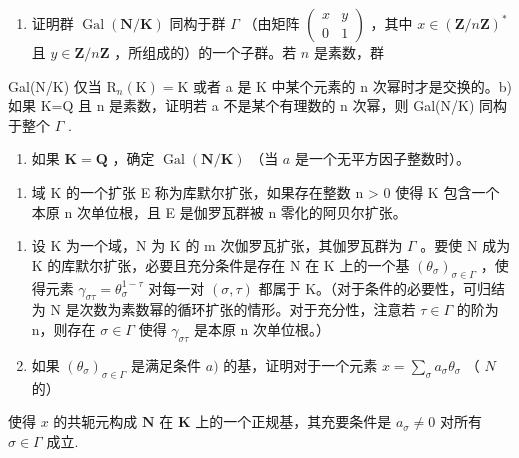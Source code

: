 \begin{enumerate}
\def\labelenumi{\alph{enumi})}
\tightlist
\item
  证明群 \(\operatorname{Gal}(\mathbf{N} / \mathbf{K})\) 同构于群 \(\Gamma\) （由矩阵 \(\left( \begin{array}{cc}x & y\\ 0 & 1 \end{array} \right)\) ，其中 \(x\in (\mathbf{Z} / n\mathbf{Z})^*\) 且 \(y\in \mathbf{Z} / n\mathbf{Z}\) ，所组成的）的一个子群。若 \(n\) 是素数，群
\end{enumerate}

Gal(N/K) 仅当 \(\mathrm{R}_{n}(\mathrm{K})=\mathrm{K}\) 或者 a 是 K 中某个元素的 n 次幂时才是交换的。b) 如果 K=Q 且 n 是素数，证明若 a 不是某个有理数的 n 次幂，则 Gal(N/K) 同构于整个 \(\Gamma\) .

\begin{enumerate}
\def\labelenumi{\alph{enumi})}
\setcounter{enumi}{2}
\tightlist
\item
  如果 \(\mathbf{K} = \mathbf{Q}\) ，确定 \(\operatorname{Gal}(\mathbf{N} / \mathbf{K})\) （当 \(a\) 是一个无平方因子整数时）。
\end{enumerate}

\begin{enumerate}
\def\labelenumi{\arabic{enumi})}
\setcounter{enumi}{6}
\tightlist
\item
  域 K 的一个扩张 E 称为库默尔扩张，如果存在整数 n \textgreater{} 0 使得 K 包含一个本原 n 次单位根，且 E 是伽罗瓦群被 n 零化的阿贝尔扩张。
\end{enumerate}

\begin{enumerate}
\def\labelenumi{\alph{enumi})}
\item
  设 K 为一个域，N 为 K 的 m 次伽罗瓦扩张，其伽罗瓦群为 \(\Gamma\) 。要使 N 成为 K 的库默尔扩张，必要且充分条件是存在 N 在 K 上的一个基 \((\theta_{\sigma})_{\sigma\in\Gamma}\) ，使得元素 \(\gamma_{\sigma\tau}=\theta_{\sigma}^{1-\tau}\) 对每一对 \((\sigma,\tau)\) 都属于 K。（对于条件的必要性，可归结为 N 是次数为素数幂的循环扩张的情形。对于充分性，注意若 \(\tau\in\Gamma\) 的阶为 n，则存在 \(\sigma\in\Gamma\) 使得 \(\gamma_{\sigma\tau}\) 是本原 n 次单位根。）
\item
  如果 \((\theta_{\sigma})_{\sigma \in \Gamma}\) 是满足条件 \(a)\) 的基，证明对于一个元素 \(x = \sum_{\sigma} a_{\sigma} \theta_{\sigma}\) （ \(N\) 的）
\end{enumerate}

使得 \(x\) 的共轭元构成 \(\mathbf{N}\) 在 \(\mathbf{K}\) 上的一个正规基，其充要条件是 \(a_{\sigma} \neq 0\) 对所有 \(\sigma \in \Gamma\) 成立.

